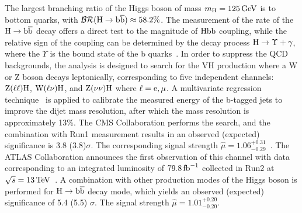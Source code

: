 The largest branching ratio of the Higgs boson of mass $m_{\mathrm{H}}=125\,\text{Ge\hspace{-.08em}V}$ is to bottom quarks, with $\mathcal{BR}(\mathrm{H}\to\mathrm{b}\overline{\mathrm{b}})\approx 58.2\%$. The measurement of the rate of the $\mathrm{H}\to \mathrm{b}\overline{\mathrm{b}}$ decay offers a direct test to the magnitude of $\mathrm{H}\mathrm{b}\mathrm{b}$ coupling, while the relative sign of the coupling can be determined by the decay process $\mathrm{H}\to\Upsilon +\gamma$, where the $\Upsilon$ is the bound state of the b quarks~\cite{Bodwin:2013gca}. 
In order to suppress the QCD backgrounds, the analysis is designed to search for the VH production where a W or Z boson decays leptonically, corresponding to five independent channels: $\mathrm{Z}(\ell\ell)\mathrm{H}$, $\mathrm{W}(\ell\nu)\mathrm{H}$, and $\mathrm{Z}(\nu\nu)\mathrm{H}$ where $\ell=\mathrm{e}, \mu$. A multivariate regression technique~\cite{Aaltonen:2011bp,Khachatryan:2015ota,Aad:2014xzb} is applied to calibrate the measured energy of the b-tagged jets to improve the dijet mass resolution, after which the mass resolution is approximately 13\%. The CMS Collaboration performs the search, and the combination with Run1 measurement results in an observed (expected) significance is 3.8 (3.8)$\sigma$. The corresponding signal strength $\hat{\mu}=1.06^{+0.31}_{-0.29}$~\cite{Sirunyan:2017elk}. The ATLAS Collaboration announces the first observation of this channel with data corresponding to an integrated luminosity of $79.8\mbox{\ensuremath{\,\text{fb}^\text{$-$1}}}$ collected in Run2 at $\sqrt{s}=13\,\text{Te\hspace{-.08em}V}$~\cite{ATLAS-CONF-2018-036}. A combination with other production modes of the Higgs boson is performed for $\mathrm{H}\to \mathrm{b}\overline{\mathrm{b}}$ decay mode, which yields an observed (expected) significance of 5.4 (5.5) $\sigma$. The signal strength $\hat{\mu}=1.01^{+0.20}_{-0.20}$.


